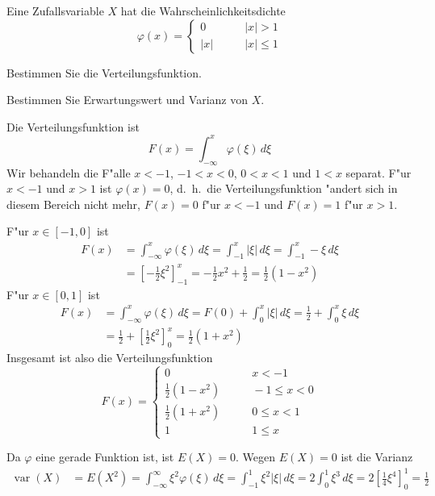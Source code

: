Eine Zufallsvariable $X$ hat die Wahrscheinlichkeitsdichte
\[
\varphi(x)=\begin{cases}
0&\qquad |x|>1\\
|x|&\qquad |x|\le 1
\end{cases}
\]
\begin{teilaufgaben}
\item Bestimmen Sie die Verteilungsfunktion.
\item Bestimmen Sie Erwartungswert und Varianz von $X$.
\end{teilaufgaben}

\begin{loesung}
\begin{teilaufgaben}
\item Die Verteilungsfunktion ist
\[
F(x)=\int_{-\infty}^x\varphi(\xi)\,d\xi
\]
Wir behandeln die F"alle $x<-1$, $-1<x<0$, $0<x<1$ und $1<x$
separat. F"ur $x<-1$ und $x>1$ ist $\varphi(x)=0$, d.~h.~die
Verteilungsfunktion "andert sich in diesem Bereich nicht mehr,
$F(x)=0$ f"ur $x<-1$ und $F(x)=1$ f"ur $x>1$.

F"ur $x\in[-1,0]$ ist
\begin{align*}
F(x)&=\int_{-\infty}^x\varphi(\xi) \,d\xi
=
\int_{-1}^x|\xi|\,d\xi
=
\int_{-1}^x-\xi\,d\xi
\\
&=\left[-\frac12\xi^2\right]_{-1}^x
=-\frac12x^2+\frac12=\frac12(1-x^2)
\end{align*}
F"ur $x\in[0,1]$ ist
\begin{align*}
F(x)
&=
\int_{-\infty}^x \varphi(\xi)\,d\xi
=
F(0)+\int_0^x|\xi|\,d\xi
=
\frac12+\int_0^x\xi\,d\xi
\\
&=
\frac12+\left[
\frac12\xi^2
\right]_0^x
=\frac12(1+x^2)
\end{align*}
Insgesamt ist also die Verteilungsfunktion
\[
F(x)
=
\begin{cases}
0&\qquad x<-1\\
\frac12(1-x^2)&\qquad -1\le x < 0\\
\frac12(1+x^2)&\qquad 0\le x <1\\
1&\qquad 1 \le x
\end{cases}
\]
\item
Da $\varphi$ eine gerade Funktion ist, ist $E(X)=0$.
Wegen $E(X)=0$ ist die Varianz
\begin{align*}
\operatorname{var}(X)&=E(X^2)
=
\int_{-\infty}^\infty \xi^2\varphi(\xi)\,d\xi
=
\int_{-1}^1\xi^2|\xi|\,d\xi
=2\int_0^1\xi^3\,d\xi=2\left[\frac14\xi^4\right]_0^1=\frac12
\end{align*}
\end{teilaufgaben}
\end{loesung}

